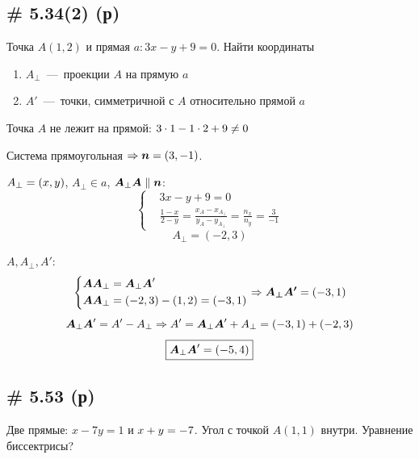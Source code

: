 \documentclass[a4paper,12pt]{article}
\begin{document}
  
  \subsection{\# 5.34(2) (р)}
  
  \begin{problem}
    Точка $A(1, 2)$ и прямая $a: 3x - y + 9 = 0$.
    Найти координаты
    \begin{enumerate}
      \item $A_{\perp}$~---~проекции $A$ на прямую $a$
      \item $A'$~---~точки, симметричной с $A$ относительно прямой $a$
    \end{enumerate}
  \end{problem}
  
  \begin{solution}
    Точка $A$ не лежит на прямой: $3 \hm\cdot 1 \hm- 1 \hm\cdot 2 \hm+ 9 \hm{\not=0}$
    
    Система прямоугольная $\Rightarrow \bds n \hm= (3, -1)$.
    
    $A_{\perp} \hm=(x, y)$, $A_{\perp} \in a$, $\bds A_{\perp} \bds A \hm\parallel \bds n$:
    \[
      \left\{
        \begin{aligned}
          &3x - y + 9 = 0\\
          &\frac{1 - x}{2 - y} = \frac{x_A - x_{A_{\perp}}}{y_A - y_{A_{\perp}}} = \frac{n_x}{n_y} = \frac{3}{-1}
        \end{aligned}
      \right.
    \]
    \[
      \boxed{A_{\perp} = (-2, 3)}
    \]
    
    $A, A_{\perp}, A'$:
    \[
      \left\{\begin{aligned}
        &\boldsymbol A \boldsymbol A_{\perp} = \boldsymbol A_{\perp} \boldsymbol A'\\
        &\boldsymbol A \boldsymbol A_{\perp} = (-2, 3) - (1, 2) = (-3, 1)
      \end{aligned}\right.
      \Rightarrow \boldsymbol{A_{\perp}A'} = (-3, 1)
    \]
    \[
      \boldsymbol A_{\perp} \boldsymbol A' = A' - A_{\perp} \Rightarrow A' = \boldsymbol A_{\perp} \boldsymbol A' + A_{\perp}
      = (-3, 1) + (-2, 3)
    \]
    \[
      \boxed{\boldsymbol A_{\perp} \boldsymbol A' = (-5, 4)}
    \]
  \end{solution}
  
  
  \subsection{\# 5.53 (р)}
  
  \begin{problem}
    Две прямые: $x - 7y = 1$ и $x + y \hm= -7$.
    Угол с точкой $A(1, 1)$ внутри.
    Уравнение биссектрисы?
  \end{problem}
  
\end{document}
